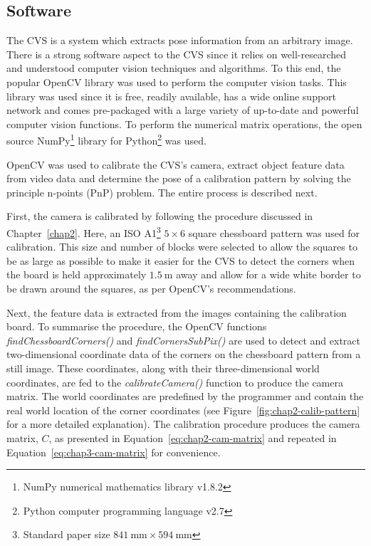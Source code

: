 \subsection{Software}
\label{sec:cv-sys-software}

The CVS is a system which extracts pose information from an arbitrary image. There is a strong software aspect to the CVS since it relies on well-researched and understood computer vision techniques and algorithms. To this end, the popular OpenCV library was used to perform the computer vision tasks. This library was used since it is free, readily available, has a wide online support network and comes pre-packaged with a large variety of up-to-date and powerful computer vision functions. To perform the numerical matrix operations, the open source NumPy\footnote{NumPy numerical mathematics library v1.8.2} library for Python\footnote{Python computer programming language v2.7} was used. 

OpenCV was used to calibrate the CVS's camera, extract object feature data from video data and determine the pose of a calibration pattern by solving the principle n-points (PnP) problem. The entire process is described next. 

First, the camera is calibrated by following the procedure discussed in Chapter~\ref{chap2}. Here, an ISO A1\footnote{Standard paper size $\SI{841}{\mm}\times\SI{594}{\mm}$} $5\times6$ square chessboard pattern was used for calibration. This size and number of blocks were selected to allow the squares to be as large as possible to make it easier for the CVS to detect the corners when the board is held approximately $\SI{1.5}{\m}$ away and allow for a wide white border to be drawn around the squares, as per OpenCV's recommendations. 

Next, the feature data is extracted from the images containing the calibration board. To summarise the procedure, the OpenCV functions \emph{findChessboardCorners()} and \emph{findCornersSubPix()} are used to detect and extract two-dimensional coordinate data of the corners on the chessboard pattern from a still image. These coordinates, along with their three-dimensional world coordinates, are fed to the \emph{calibrateCamera()} function to produce the camera matrix. The world coordinates are predefined by the programmer and contain the real world location of the corner coordinates (see Figure~\ref{fig:chap2-calib-pattern} for a more detailed explanation). The calibration procedure produces the camera matrix, $C$, as presented in Equation~\ref{eq:chap2-cam-matrix} and repeated in Equation~\ref{eq:chap3-cam-matrix} for convenience. 

